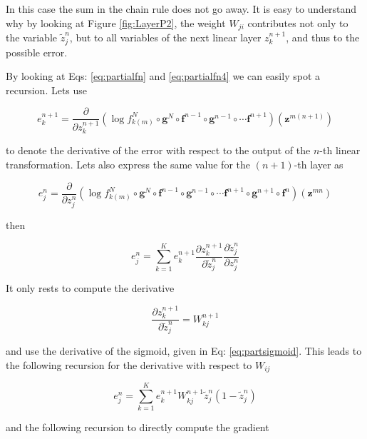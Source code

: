 In this case the sum in the chain rule does not go away. It is easy to understand why by looking at Figure \ref{fig:LayerP2}, the weight $W_{ji}$ contributes not only to the variable $\tilde{z}^n_j$, but to all variables of the next linear layer $z^{n+1}_k$, and thus to the possible error. 

By looking at Eqs: \ref{eq:partialfn} and \ref{eq:partialfn4} we can easily spot a recursion. Lets use

\begin{equation}
e^{n+1}_k = \frac{\partial}{\partial z^{n+1}_{k}} (\log f_{k(m)}^N \circ \mathbf{g}^N \circ \mathbf{f}^{n-1} \circ \mathbf{g}^{n-1} \circ \cdots \mathbf{f}^{n+1})(\mathbf{z}^{m(n+1)})
\end{equation}

\noindent to denote the derivative of the error with respect to the output of the $n$-th linear transformation. Lets also express the same value for the $(n+1)$-th layer as   

\begin{equation}
e^{n}_j = \frac{\partial}{\partial z^{n}_{j}} (\log f_{k(m)}^N \circ \mathbf{g}^N \circ \mathbf{f}^{n-1} \circ \mathbf{g}^{n-1} \circ \cdots \mathbf{f}^{n+1} \circ \mathbf{g}^{n+1} \circ \mathbf{f}^{n})(\mathbf{z}^{mn}) 
\end{equation}

\noindent then

\begin{equation}
e^{n}_j = \sum_{k=1}^K e^{n+1}_k \frac{\partial z^{n+1}_k}{\partial \tilde{z}_{j}^n}\frac{\partial \tilde{z}^n_{j}}{\partial z_{j}^n} 
\end{equation}

\noindent It only rests to compute the derivative

\begin{equation}
\frac{\partial z^{n+1}_k}{\partial \tilde{z}_{j}^n} = W_{kj}^{n+1} 
\end{equation}

\noindent and use the derivative of the sigmoid, given in Eq: \ref{eq:partsigmoid}. This leads to the following recursion for the derivative with respect to $W_{ij}$

\begin{equation}
e^{n}_j = \sum_{k=1}^K e^{n+1}_k W_{kj}^{n+1}\tilde{z}^n_{j}(1-\tilde{z}^n_{j})
\end{equation}

\noindent and the following recursion to directly compute the gradient

